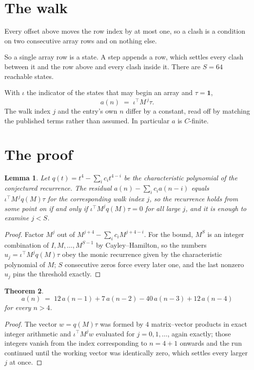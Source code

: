 \documentclass[11pt,a4paper]{article}
\theoremstyle{plain}
\newtheorem{theorem}{Theorem}
\newtheorem{lemma}[theorem]{Lemma}
\theoremstyle{definition}
\begin{document}
\section{The walk}

Every offset above moves the row index by at most one, so a clash is a condition on two
consecutive array rows and on nothing else.

So a single array row is a state. A step appends a row, which settles every clash between it
and the row above and every clash inside it. There are $S=64$ reachable states.

With $\iota$ the indicator of the states that may begin an array and $\tau=\mathbf{1}$,
\[
a(n)\;=\;\iota^{\!\top}M^{\,j}\tau .
\]
The walk index $j$ and the entry's own $n$ differ by a constant, read off by matching the
published terms rather than assumed. In particular $a$ is $C$-finite.

\section{The proof}

\begin{lemma}\label{lem:crit}
Let $q(t)=t^{4}-\sum_i c_it^{4-i}$ be the characteristic polynomial of the
conjectured recurrence. The residual $a(n)-\sum_ic_ia(n-i)$ equals
$\iota^{\!\top}M^{\,j}q(M)\tau$ for the corresponding walk index $j$, so the recurrence
holds from some point on if and only if $\iota^{\!\top}M^{j}q(M)\tau=0$ for all large $j$,
and it is enough to examine $j<S$.
\end{lemma}

\begin{proof}
Factor $M^{j}$ out of $M^{j+4}-\sum_ic_iM^{j+4-i}$. For the bound, $M^{S}$
is an integer combination of $I,M,\dots,M^{S-1}$ by Cayley--Hamilton, so the numbers
$u_j=\iota^{\!\top}M^{j}q(M)\tau$ obey the monic recurrence given by the characteristic
polynomial of $M$; $S$ consecutive zeros force every later one, and the last nonzero $u_j$
pins the threshold exactly.
\end{proof}

\begin{theorem}
\[
a(n)\;=\;12\,a(n-1) + 7\,a(n-2) - 40\,a(n-3) + 12\,a(n-4)
\]
for every $n>4$.
\end{theorem}

\begin{proof}
The vector $w=q(M)\tau$ was formed by $4$ matrix--vector products in exact integer
arithmetic and $\iota^{\!\top}M^{j}w$ evaluated for $j=0,1,\dots$, again exactly; those
integers vanish from the index corresponding to $n=4+1$ onwards and the run continued
until the working vector was identically zero, which settles every larger $j$ at once.
\end{proof}
\end{document}

